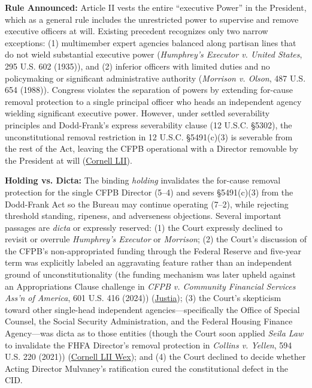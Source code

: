 \documentclass[12pt]{article}
\begin{document}
\textbf{Rule Announced:} Article II vests the entire ``executive Power'' in the President, which as a general rule includes the unrestricted power to supervise and remove executive officers at will. Existing precedent recognizes only two narrow exceptions: (1) multimember expert agencies balanced along partisan lines that do not wield substantial executive power (\textit{Humphrey's Executor v. United States}, 295 U.S. 602 (1935)), and (2) inferior officers with limited duties and no policymaking or significant administrative authority (\textit{Morrison v. Olson}, 487 U.S. 654 (1988)). Congress violates the separation of powers by extending for-cause removal protection to a single principal officer who heads an independent agency wielding significant executive power. However, under settled severability principles and Dodd-Frank's express severability clause (12 U.S.C. \S 5302), the unconstitutional removal restriction in 12 U.S.C. \S 5491(c)(3) is severable from the rest of the Act, leaving the CFPB operational with a Director removable by the President at will (\href{https://www.law.cornell.edu/supremecourt/text/19-7}{Cornell LII}).

\textbf{Holding vs. Dicta:} The binding \textit{holding} invalidates the for-cause removal protection for the single CFPB Director (5--4) and severs \S 5491(c)(3) from the Dodd-Frank Act so the Bureau may continue operating (7--2), while rejecting threshold standing, ripeness, and adverseness objections. Several important passages are \textit{dicta} or expressly reserved: (1) the Court expressly declined to revisit or overrule \textit{Humphrey's Executor} or \textit{Morrison}; (2) the Court's discussion of the CFPB's non-appropriated funding through the Federal Reserve and five-year term was explicitly labeled an aggravating feature rather than an independent ground of unconstitutionality (the funding mechanism was later upheld against an Appropriations Clause challenge in \textit{CFPB v. Community Financial Services Ass'n of America}, 601 U.S. 416 (2024)) (\href{https://supreme.justia.com/cases/federal/us/601/22-448/}{Justia}); (3) the Court's skepticism toward other single-head independent agencies---specifically the Office of Special Counsel, the Social Security Administration, and the Federal Housing Finance Agency---was dicta as to those entities (though the Court soon applied \textit{Seila Law} to invalidate the FHFA Director's removal protection in \textit{Collins v. Yellen}, 594 U.S. 220 (2021)) (\href{https://www.law.cornell.edu/wex/unitary_executive_theory_\%28uet\%29}{Cornell LII Wex}); and (4) the Court declined to decide whether Acting Director Mulvaney's ratification cured the constitutional defect in the CID.
\end{document}

